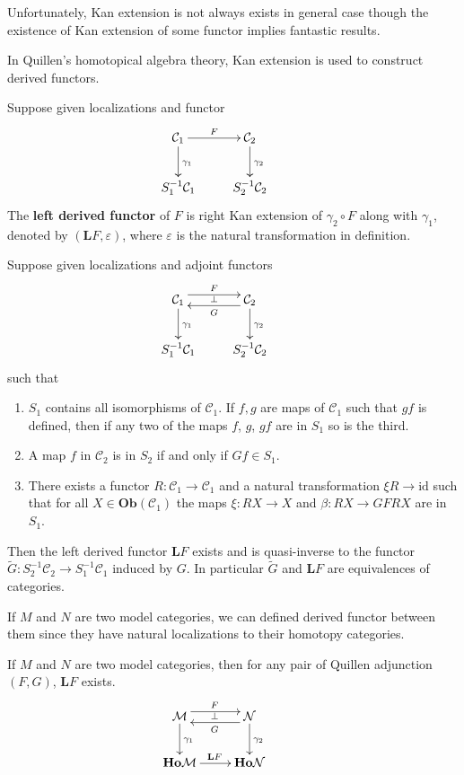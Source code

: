 Unfortunately, Kan extension is not always exists in general case though the existence of Kan extension of some functor implies fantastic results.
\par
In Quillen's homotopical algebra theory, Kan extension is used to construct derived functors.
\begin{mydefn}
Suppose given localizations and functor
\[
\xymatrix{
\mathcal{C}_{1} \ar[r]^{F} \ar[d]^{\gamma_{1}}& \mathcal{C}_{2} \ar[d]^{\gamma_{2}}&\\
S_{1}^{-1}\mathcal{C}_{1}&S_{2}^{-1}\mathcal{C}_{2}
}
\]
The \textbf{left derived functor} of $F$ is right Kan extension of $\gamma_{2} \circ F$ along with $\gamma_{1}$, denoted by $(\mathbf{L}F, \varepsilon)$, where $\varepsilon$ is the natural transformation in definition.
\end{mydefn}
\begin{prop}
Suppose given localizations and adjoint functors
\[
\xymatrix{
\mathcal{C}_{1} \ar@<1ex>[r]^{F} \ar[d]^{\gamma_{1}}& \mathcal{C}_{2} \ar@<1ex>[l]^{G}_{\bot} \ar[d]^{\gamma_{2}}&\\
S_{1}^{-1}\mathcal{C}_{1}&S_{2}^{-1}\mathcal{C}_{2}
}
\]
such that
\begin{enumerate}
    \item $S_{1}$ contains all isomorphisms of $\mathcal{C}_{1}$. If $f,g$ are maps of $\mathcal{C}_{1}$ such that $gf$ is defined, then if any two of the maps $f$, $g$, $gf$ are in $S_{1}$ so is the third.
    \item A map $f$ in $\mathcal{C}_{2}$ is in $S_{2}$ if and only if $Gf \in S_{1}$.
    \item There exists a functor $R:\mathcal{C}_{1} \rightarrow \mathcal{C}_{1}$ and a natural transformation $\xi R \rightarrow \text{id}$ such that for all $X \in \mathbf{Ob}(\mathcal{C}_{1})$ the maps $\xi: RX \rightarrow X$ and $\beta: RX \rightarrow GFRX$ are in $S_{1}$.
\end{enumerate}
\par
Then the left derived functor $\mathbf{L}F$ exists and is quasi-inverse to the functor $\widetilde{G}: S_{2}^{-1}\mathcal{C}_{2} \rightarrow S_{1}^{-1}\mathcal{C}_{1}$ induced by $G$. In particular $\widetilde{G}$ and $\mathbf{L}F$ are equivalences of categories.
\end{prop}

If $M$ and $N$ are two model categories, we can defined derived functor between them since they have natural localizations to their homotopy categories.
\begin{cor}
If $M$ and $N$ are two model categories, then for any pair of Quillen adjunction $(F,G)$, $\mathbf{L}F$ exists.
\[
\xymatrix{
\mathcal{M} \ar@<1ex>[r]^{F} \ar[d]^{\gamma_{1}}& \mathcal{N} \ar@<1ex>[l]^{G}_{\bot} \ar[d]^{\gamma_{2}}&\\
\mathbf{Ho}\mathcal{M} \ar[r]^{\mathbf{L}F}&\mathbf{Ho}\mathcal{N}
}
\]
\end{cor}